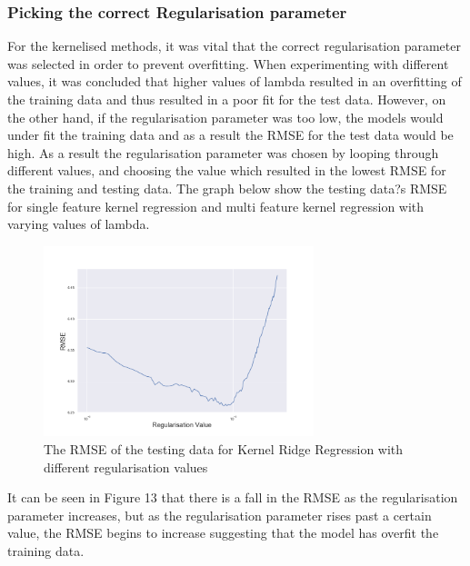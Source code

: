 \documentclass[a4paper,11pt,twoside]{article}
\begin{document}
\subsubsection{Picking the correct Regularisation parameter}

For the kernelised methods, it was vital that the correct regularisation parameter was selected in order to prevent overfitting. When experimenting with different values, it was concluded that higher values of lambda resulted in an overfitting of the training data and thus resulted in a poor fit for the test data. However, on the other hand, if the regularisation parameter was too low, the models would under fit the training data and as a result the RMSE for the test data would be high. As a result the regularisation parameter was chosen by looping through different values, and choosing the value which resulted in the lowest RMSE for the training and testing data. The graph below show the testing data?s RMSE for single feature kernel regression and multi feature kernel regression with varying values of lambda. 

      \begin{figure}[!htb]
        \centerline{\includegraphics[width=0.7\textwidth]
        {../errvals.png}}
        \caption{\label{fig:my-label} The RMSE of the testing data for Kernel Ridge Regression with different regularisation values}
      \end{figure}


It can be seen in Figure 13 that there is a fall in the RMSE as the regularisation parameter increases, but as the regularisation parameter rises past a certain value, the RMSE begins to increase suggesting that the model has overfit the training data.
\end{document}
